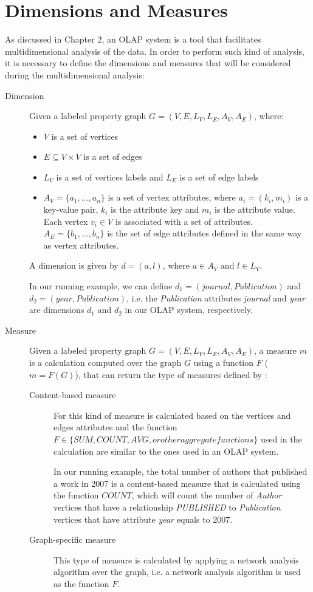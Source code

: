 \section{Dimensions and Measures}

As discussed in Chapter 2, an OLAP system is a tool that facilitates multidimensional analysis of the data. In order to perform such kind of analysis, it is necessary to define the dimensions and measures that will be considered during the multidimensional analysis:
\begin{description}
\item[Dimension] Given a labeled property graph $G = (V, E, L_V, L_E, A_V, A_E)$, where:
\begin{itemize}
\item $V$ is a set of vertices
\item $E \subseteq V \times V$ is a set of edges 
\item $L_V$ is a set of vertices labels and $L_E$ is a set of edge labels
\item $A_V = \{a_1, \dots, a_n\}$ is a set of vertex attributes, where $a_i = (k_i, m_i)$ is a key-value pair, $k_i$ is the attribute key and $m_i$ is the attribute value. Each vertex $v_i \in V$ is associated with a set of attributes. $A_E = \{b_1, \dots, b_n\}$ is the set of edge attributes defined in the same way as vertex attributes.
\end{itemize}
 A dimension is given by $d = (a, l)$, where $a \in A_V$ and $l \in L_V$. 

In our running example, we can define $d_1 = (journal, Publication)$ and $d_2 = (year, Publication)$, i.e. the \emph{Publication} attributes \emph{journal} and \emph{year} are dimensions $d_1$ and $d_2$ in our OLAP system, respectively.

\item[Measure] Given a labeled property graph $G = (V, E, L_V, L_E, A_V, A_E)$, a measure $m$ is a calculation computed over the graph $G$ using a function $F$ ($m=F(G)$), that can return the type of measures defined by  \cite{ghrab2015framework}:
\begin{description}
\item[Content-based measure] For this kind of measure is calculated based on the vertices and edges attributes and the function $F \in \{SUM, COUNT, AVG, or other aggregate functions\}$ used in the calculation are similar to the ones used in an OLAP system. 

In our running example, the total number of authors that published a work in 2007 is a content-based measure that is calculated using the function $COUNT$, which will count the number of \emph{Author} vertices that have a relationship \emph{PUBLISHED} to \emph{Publication} vertices that have attribute \emph{year} equals to 2007.
\item[Graph-specific measure] This type of measure is calculated by applying a network analysis algorithm over the graph, i.e. a network analysis algorithm is used as the function $F$. 


\end{description}
\end{description}
